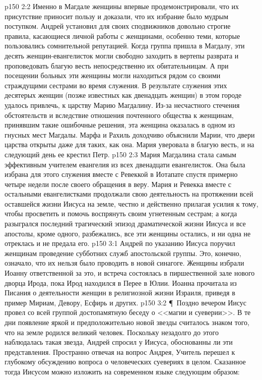 \vs p150 2:2 Именно в Магдале женщины впервые продемонстрировали, что их присутствие приносит пользу и доказали, что их избрание было мудрым поступком. Андрей установил для своих сподвижников довольно строгие правила, касающиеся личной работы с женщинами, особенно теми, которые пользовались сомнительной репутацией. Когда группа пришла в Магдалу, эти десять женщин\hyp{}евангелисток могли свободно заходить в вертепы разврата и проповедовать благую весть непосредственно их обитательницам. А при посещении больных эти женщины могли находиться рядом со своими страждущими сестрами во время служения. В результате служения этих десятерых женщин (позже известных как двенадцать женщин) в этом городе удалось привлечь, к царству Марию Магдалину. Из\hyp{}за несчастного стечения обстоятельств и вследствие отношения почтенного общества к женщинам, принявшим такие ошибочные решения, эта женщина оказалась в одном из гнусных мест Магдалы. Марфа и Рахиль доходчиво объяснили Марии, что двери царства открыты даже для таких, как она. Мария уверовала в благую весть, и на следующий день ее крестил Петр.
\vs p150 2:3 Мария Магдалина стала самым эффективным учителем евангелия из всех двенадцати евангелисток. Она была избрана для этого служения вместе с Ревеккой в Иотапате спустя примерно четыре недели после своего обращения в веру. Мария и Ревекка вместе с остальными евангелистками продолжали свою деятельность на протяжении всей оставшейся жизни Иисуса на земле, честно и действенно прилагая усилия к тому, чтобы просветить и помочь воспрянуть своим угнетенным сестрам; а когда разыгрался последний трагический эпизод драматической жизни Иисуса и все апостолы, кроме одного, разбежались, все эти женщины остались, и ни одна не отреклась и не предала его.
\vs p150 3:1 Андрей по указанию Иисуса поручил женщинам проведение субботних служб апостольской группы. Это, конечно, означало, что их нельзя было проводить в новой синагоге. Женщины избрали Иоанну ответственной за это, и встреча состоялась в пиршественной зале нового дворца Ирода, пока Ирод находился в Перее в Юлии. Иоанна прочитала из Писания о деятельности женщин в религиозной жизни Израиля, приведя в пример Мириам, Девору, Есфирь и других.
\vs p150 3:2 \P\ Поздно вечером Иисус провел со всей группой достопамятную беседу о <<магии и суеверии>>. В те дни появление яркой и предположительно новой звезды считалось знаком того, что на земле родился великий человек. Поскольку незадолго до этого наблюдалась такая звезда, Андрей спросил у Иисуса, обоснованны ли эти представления. Пространно отвечая на вопрос Андрея, Учитель перешел к глубокому обсуждению вопроса о человеческих суевериях в целом. Сказанное тогда Иисусом можно изложить на современном языке следующим образом:

